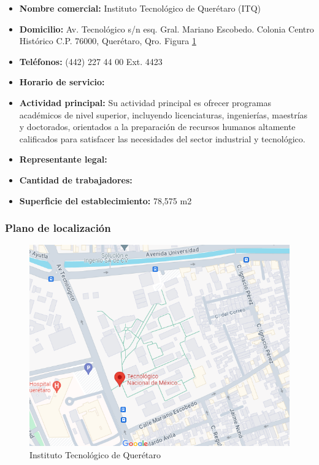 \begin{itemize}
    \item\textbf{Nombre comercial:} Instituto Tecnológico de Querétaro (ITQ)
    \item\textbf{Domicilio:} Av. Tecnológico s/n esq. Gral. Mariano Escobedo. Colonia Centro Histórico C.P. 76000, Querétaro, Qro. Figura \ref{fig:plano.png}
    \item\textbf{Teléfonos:} (442) 227 44 00 Ext. 4423
    \item\textbf{Horario de servicio:}
    \item\textbf{Actividad principal:} Su actividad principal es ofrecer programas académicos de nivel superior, incluyendo licenciaturas, ingenierías, maestrías y doctorados, orientados a la preparación de recursos humanos altamente calificados para satisfacer las necesidades del sector industrial y tecnológico.
    \item\textbf{Representante legal:} 
    \item\textbf{Cantidad de trabajadores:} 
    \item\textbf{Superficie del establecimiento:} 78,575 m2
\end{itemize}
%
%
\subsubsection{Plano de localización}
%
%
\begin{figure}[H]
    \centering
    \includegraphics[scale=0.4]{10/Img/plano.png}
    \caption{Instituto Tecnológico de Querétaro}
    \label{fig:plano.png}
\end{figure}
%
%
